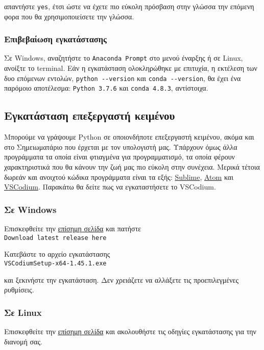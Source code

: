 \documentclass[a4paper,14pt]{extreport}
\begin{document}
απαντήστε \lstinline{yes}, έτσι ώστε να έχετε πιο εύκολη πρόσβαση στην γλώσσα την επόμενη φορα που θα χρησιμοποιείσετε την γλώσσα.

\subsubsection{Επιβεβαίωση εγκατάστασης}

Σε Windows, αναζητήστε το \lstinline{Anaconda Prompt}
στο μενού έναρξης ή σε Linux, ανοίξτε το terminal.
Εάν η εγκατάσταση ολοκληρώθηκε με επιτυχία, η εκτέλεση των δυο επόμενων
εντολών, \lstinline{python --version} και
\lstinline{conda --version}, θα έχει ένα παρόμοιο
αποτέλεσμα: \lstinline{Python 3.7.6} και
\lstinline{conda 4.8.3}, αντίστοιχα.

\subsection{Εγκατάσταση επεξεργαστή κειμένου}

Μπορούμε να γράψουμε Python σε οποιονδήποτε επεξεργαστή κειμένου, ακόμα και στο Σημειωματάριο που έρχεται με τον υπολογιστή μας. Υπάρχουν όμως άλλα προγράμματα τα οποία είναι φτιαγμένα για προγραμματισμό, τα οποία φέρουν χαρακτηριστικά που θα κάνουν την ζωή μας πιο εύκολη στην συνέχεια. Μερικά τέτοια δωρεάν και ανοιχτού κώδικα προγράμματα είναι τα εξής: \href{https://tinyurl.com/hh3vvrn}{Sublime}, \href{https://tinyurl.com/l2uxckn}{Atom} και \href{https://tinyurl.com/y54gclet}{VSCodium}. Παρακάτω θα δείτε πως να εγκαταστήσετε το VSCodium.

\subsubsection{Σε Windows}

Επισκεφθείτε την \href{https://tinyurl.com/ybqxegq3}{επίσημη σελίδα} και πατήστε\\\lstinline{Download latest release here}

Κατεβάστε το αρχείο εγκατάστασης\\\lstinline{VSCodiumSetup-x64-1.45.1.exe}

και ξεκινήστε την εγκατάσταση. Δεν χρειάζετε να αλλάξετε τις προεπιλεγμένες ρυθμίσεις.

\subsubsection{Σε Linux}
Επισκεφθείτε την \href{https://tinyurl.com/ybqxegq3}{επίσημη σελίδα} και
ακολουθήστε τις οδηγίες εγκατάστασης για την διανομή σας.
\end{document}
